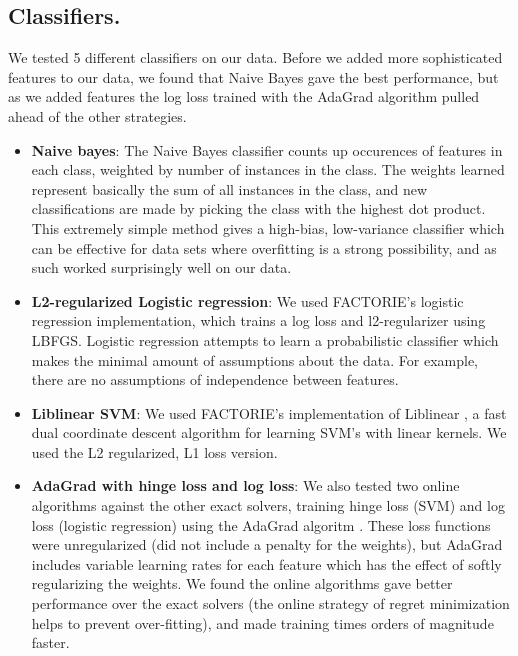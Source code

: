 \documentclass[11pt]{article}
\begin{document}
\subsection*{Classifiers.}We tested 5 different classifiers on our data. Before we added more sophisticated features to our data, we found that Naive Bayes gave the best performance, but as we added features the log loss trained with the AdaGrad algorithm pulled ahead of the other strategies.
 \begin{itemize}
\item \textbf{Naive bayes}: The Naive Bayes classifier counts up occurences of features in each class, weighted by number of instances in the class. The weights learned represent basically the sum of all instances in the class, and new classifications are made by picking the class with the highest dot product. This extremely simple method gives a high-bias, low-variance classifier which can be effective for data sets where overfitting is a strong possibility, and as such worked surprisingly well on our data.
\item \textbf{L2-regularized Logistic regression}: We used FACTORIE's logistic regression implementation, which trains a log loss and l2-regularizer using LBFGS. Logistic regression attempts to learn a probabilistic classifier which makes the minimal amount of assumptions about the data. For example, there are no assumptions of independence between features.
\item \textbf{Liblinear SVM}: We used FACTORIE's implementation of Liblinear \cite{chang:08a}, a fast dual coordinate descent algorithm for learning SVM's with linear kernels. We used the L2 regularized, L1 loss version.
\item \textbf{AdaGrad with hinge loss and log loss}: We also tested two online algorithms against the other exact solvers, training hinge loss (SVM) and log loss (logistic regression) using the AdaGrad algoritm \cite{duchi:11a}. These loss functions were unregularized (did not include a penalty for the weights), but AdaGrad includes variable learning rates for each feature which has the effect of softly regularizing the weights. We found the online algorithms gave better performance over the exact solvers (the online strategy of regret minimization helps to prevent over-fitting), and made training times orders of magnitude faster.
\end{itemize}
\end{document}
